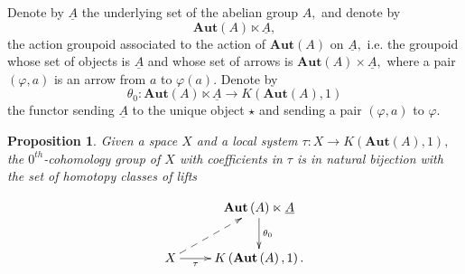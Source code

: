 \documentclass[12pt]{amsart}
\newtheorem{proposition}[dummy]{Proposition}
\theoremstyle{definition}
\def\Aut{\mathbf{Aut}}
\begin{document}
Denote by $\underline{A}$ the underlying set of the abelian group $A,$ and denote by $$\Aut\left(A\right) \ltimes \underline{A},$$ the action groupoid associated to the action of $\Aut\left(A\right)$ on $\underline{A},$ i.e. the groupoid whose set of objects is $\underline{A}$ and whose set of arrows is $\Aut\left(A\right) \times \underline{A},$ where a pair $\left(\varphi,a\right)$ is an arrow from $a$ to $\varphi\left(a\right).$ Denote by $$\theta_0:\Aut\left(A\right) \ltimes \underline{A} \to K\left(\Aut\left(A\right),1\right)$$ the functor sending $\underline{A}$ to the unique object $\star$ and sending a pair $\left(\varphi,a\right)$ to $\varphi.$

\begin{proposition}\label{prop:0th coh}
Given a space $X$ and a local system $\tau:X \to K\left(\Aut\left(A\right),1\right),$ the $0^{th}$-cohomology group of $X$ with coefficients in $\tau$ is in natural bijection with the set of homotopy classes of lifts


$$\xymatrix{ & \Aut\left(A\right) \ltimes \underline{A} \ar[d]^-{\theta_0}\\
X \ar[r]_-{\tau} \ar@{-->}[ru] & K\left(\Aut\left(A\right),1\right).}$$
\end{proposition}
\end{document}
